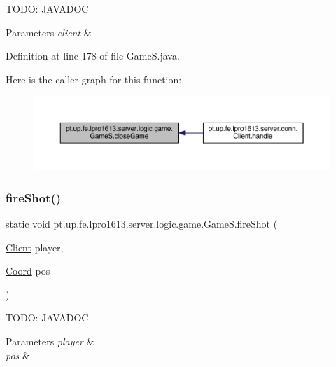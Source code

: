 T\+O\+DO\+: J\+A\+V\+A\+D\+OC 
\begin{DoxyParams}{Parameters}
{\em client} & \\
\hline
\end{DoxyParams}


Definition at line 178 of file Game\+S.\+java.

Here is the caller graph for this function\+:
\nopagebreak
\begin{figure}[H]
\begin{center}
\leavevmode
\includegraphics[width=350pt]{classpt_1_1up_1_1fe_1_1lpro1613_1_1server_1_1logic_1_1game_1_1_game_s_ad46d38d4c8bf34645dd93cbb2d79de12_icgraph}
\end{center}
\end{figure}
\hypertarget{classpt_1_1up_1_1fe_1_1lpro1613_1_1server_1_1logic_1_1game_1_1_game_s_a13d63cfefe7a487a5c6e694bbeba57e6}{}\label{classpt_1_1up_1_1fe_1_1lpro1613_1_1server_1_1logic_1_1game_1_1_game_s_a13d63cfefe7a487a5c6e694bbeba57e6} 
\subsubsection{\texorpdfstring{fire\+Shot()}{fireShot()}}
{\footnotesize\ttfamily static void pt.\+up.\+fe.\+lpro1613.\+server.\+logic.\+game.\+Game\+S.\+fire\+Shot (\begin{DoxyParamCaption}\item[{\hyperlink{classpt_1_1up_1_1fe_1_1lpro1613_1_1server_1_1conn_1_1_client}{Client}}]{player,  }\item[{\hyperlink{classpt_1_1up_1_1fe_1_1lpro1613_1_1sharedlib_1_1utils_1_1_coord}{Coord}}]{pos }\end{DoxyParamCaption})\hspace{0.3cm}{\ttfamily [static]}}

T\+O\+DO\+: J\+A\+V\+A\+D\+OC 
\begin{DoxyParams}{Parameters}
{\em player} & \\
\hline
{\em pos} & \\
\hline
\end{DoxyParams}


